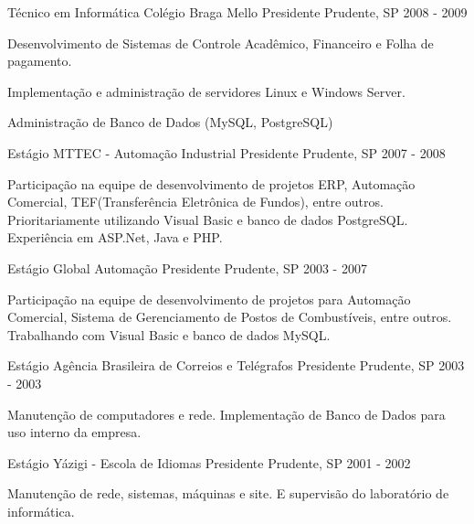 \begin{cventries}
  \cventry
    {Técnico em Informática} %
    {Colégio Braga Mello} %
    {Presidente Prudente, SP} %
    {2008 - 2009} %
    {
      \begin{cvitems} %
        \item {Desenvolvimento de Sistemas de Controle Acadêmico, Financeiro e Folha de pagamento.}
        \item {Implementação e administração de servidores Linux e Windows Server.}
        \item {Administração de Banco de Dados (MySQL, PostgreSQL)}
      \end{cvitems}
    }


\cventry
{Estágio} %
{MTTEC - Automação Industrial} %
{Presidente Prudente, SP} %
{2007 - 2008} %
{
  \begin{cvitems} %
    \item {Participação na equipe de desenvolvimento de projetos ERP, Automação Comercial, TEF(Transferência Eletrônica de Fundos), entre outros. Prioritariamente utilizando Visual Basic e banco de dados PostgreSQL. Experiência em ASP.Net, Java e PHP.}
  \end{cvitems}
}


\cventry
{Estágio} %
{Global Automação} %
{Presidente Prudente, SP} %
{2003 - 2007} %
{
  \begin{cvitems} %
    \item {Participação na equipe de desenvolvimento de projetos para Automação Comercial, Sistema de Gerenciamento de Postos de Combustíveis, entre outros. Trabalhando com Visual Basic e banco de dados MySQL.}
  \end{cvitems}
}


\cventry
{Estágio} %
{Agência Brasileira de Correios e Telégrafos} %
{Presidente Prudente, SP} %
{2003 - 2003} %
{
  \begin{cvitems} %
    \item {Manutenção de computadores e rede. Implementação de Banco de Dados para uso interno da empresa.}
  \end{cvitems}
}


\cventry
{Estágio} %
{Yázigi - Escola de Idiomas} %
{Presidente Prudente, SP} %
{2001 - 2002} %
{
  \begin{cvitems} %
    \item {Manutenção de rede, sistemas, máquinas e site. E supervisão do laboratório de informática.}
  \end{cvitems}
}


\end{cventries}
